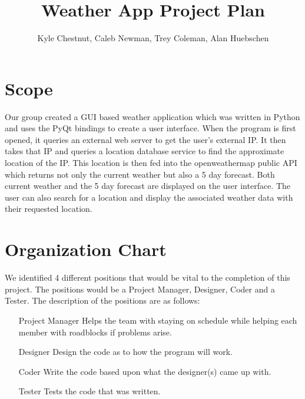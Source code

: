 \documentclass[12pt, titlepage]{article}
\title{Weather App Project Plan}
\author{Kyle Chestnut, Caleb Newman, Trey Coleman, Alan Huebschen}
\begin{document}
\maketitle

\section*{Scope}

Our group created a GUI based weather application which was written in Python and uses the PyQt bindings to create a user interface. When the program is first opened, it queries an external web server to get the user’s external IP. It then takes that IP and queries a location database service to find the approximate location of the IP. This location is then fed into the openweathermap public API which returns not only the current weather but also a 5 day forecast. Both current weather and the 5 day forecast are displayed on the user interface. The user can also search for a location and display the associated weather data with their requested location.

\section*{Organization Chart}

We identified 4 different positions that would be vital to the completion of this project.  The positions would be a Project Manager, Designer, Coder and a Tester.  The description of the positions are as follows:

\begin{itemize}
    \item[Project Manager] Helps the team with staying on schedule while helping each member with roadblocks if problems arise.
    \item[Designer] Design the code as to how the program will work.
    \item[Coder] Write the code based upon what the designer(s) came up with.
    \item[Tester] Tests the code that was written.
\end{itemize}

\begin{center}
\end{center}
\end{document}
